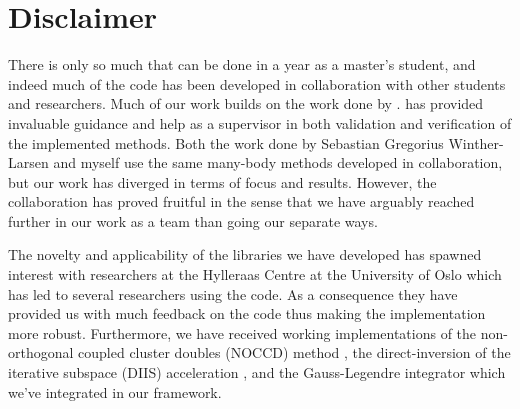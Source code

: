     \section{Disclaimer}
        There is only so much that can be done in a year as a master's student,
        and indeed much of the code has been developed in collaboration with
        other students and researchers.
        Much of our work builds on the work done by
        \citeauthor{kristiansen2017time} \cite{kristiansen2017time}.
        \citeauthor{kristiansen2017time} has provided invaluable guidance and
        help as a supervisor in both validation and verification of the
        implemented methods.
        Both the work done by Sebastian Gregorius Winther-Larsen
        \cite{greg-winther} and myself use the same many-body methods developed
        in collaboration, but our work has diverged in terms of focus and
        results.
        However, the collaboration has proved fruitful in the sense that we have
        arguably reached further in our work as a team than going our separate
        ways.

        The novelty and applicability of the libraries we have developed has
        spawned interest with researchers at the Hylleraas Centre at the
        University of Oslo which has led to several researchers using the code.
        As a consequence they have provided us with much feedback on the code
        thus making the implementation more robust.
        Furthermore, we have received working implementations of the
        non-orthogonal coupled cluster doubles (NOCCD) method \cite{rolf-nocc},
        the direct-inversion of the iterative subspace (DIIS) acceleration
        \cite{rolf-nocc}, and the Gauss-Legendre \cite{pedersen2018symplectic}
        integrator which we've integrated in our framework.
